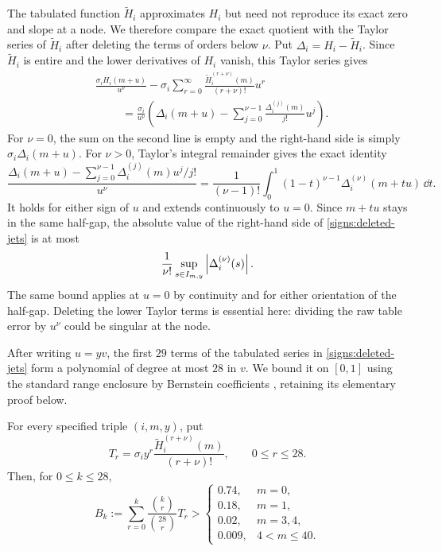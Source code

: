 The tabulated function $\widetilde H_i$ approximates $H_i$ but need not
reproduce its exact zero and slope at a node.  We therefore compare the
exact quotient with the Taylor series of $\widetilde H_i$ after deleting
the terms of orders below $\nu$.  Put $\Delta_i=H_i-\widetilde H_i$.
Since $\widetilde H_i$ is entire and the lower derivatives of $H_i$ vanish,
this Taylor series gives
\begin{align}\label{signs:deleted-jets}
 &\frac{\sigma_i H_i(m+u)}{u^\nu}
 -\sigma_i\sum_{r=0}^{\infty}
       \frac{\widetilde H_i^{(r+\nu)}(m)}{(r+\nu)!}u^r
 \nonumber\\
 &\hspace{1cm}=
 \frac{\sigma_i}{u^\nu}
 \left(\Delta_i(m+u)-
       \sum_{j=0}^{\nu-1}\frac{\Delta_i^{(j)}(m)}{j!}u^j\right).
\end{align}
For $\nu=0$, the sum on the second line is empty and the right-hand side is
simply $\sigma_i\Delta_i(m+u)$.  For $\nu>0$, Taylor's integral remainder
gives the exact identity
\[
 \frac{\Delta_i(m+u)-\sum_{j=0}^{\nu-1}
             \Delta_i^{(j)}(m)u^j/j!}{u^\nu}
 =\frac{1}{(\nu-1)!}\int_0^1(1-t)^{\nu-1}
                \Delta_i^{(\nu)}(m+tu)\,\dd t.
\]
It holds for either sign of $u$ and extends continuously to $u=0$.
Since $m+tu$ stays in the same half-gap, the absolute value of the
right-hand side of \eqref{signs:deleted-jets} is at most
\begin{equation}\label{signs:coefficient-error}
  \frac{1}{\nu!}\sup_{s\in I_{m,y}}
       \left\lvert\Delta_i^{(\nu)}(s)\right\rvert.
\end{equation}
The same bound applies at $u=0$ by continuity and for either orientation
of the half-gap.  Deleting the lower Taylor terms is essential here:
dividing the raw table error by $u^\nu$ could be singular at the node.

After writing $u=yv$, the first $29$ terms of the tabulated series in
\eqref{signs:deleted-jets} form a polynomial of degree at most $28$ in
$v$.  We bound it on $[0,1]$ using the standard range enclosure by Bernstein
coefficients \cite[Section~3]{TitiGarloff2019}, retaining its elementary
proof below.

\begin{lemma}\label{signs:bernstein}
For every specified triple $(i,m,y)$, put
\begin{equation}\label{signs:power-coefficients}
  T_r=\sigma_i y^r
       \frac{\widetilde H_i^{(r+\nu)}(m)}{(r+\nu)!},
  \qquad 0\le r\le28.
\end{equation}
Then, for $0\le k\le28$,
\begin{equation}\label{signs:bernstein-bound}
  B_k:=\sum_{r=0}^k
       \frac{\binom{k}{r}}{\binom{28}{r}}T_r
  >\begin{cases}
      0.74,&m=0,\\
      0.18,&m=1,\\
      0.02,&m=3,4,\\
      0.009,&4<m\le40.
    \end{cases}
\end{equation}
\end{lemma}

